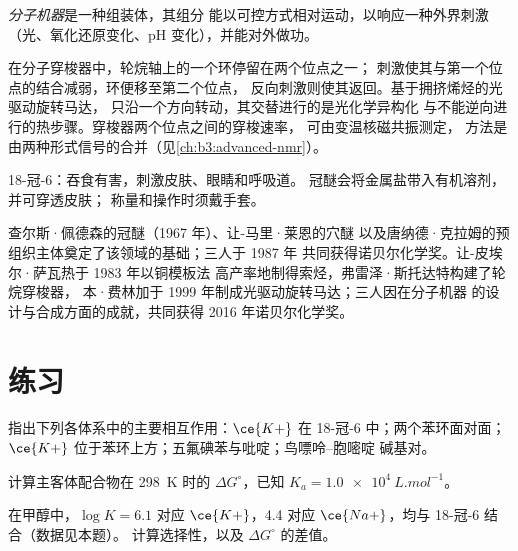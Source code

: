 \begin{definition}[分子机器]\label{def:b3:supramolecular:machine}
\emph{分子机器}是一种组装体，其组分
能以可控方式相对运动，以响应一种外界刺激
（光、氧化还原变化、pH 变化），并能对外做功。
\end{definition}

在分子穿梭器中，轮烷轴上的一个环停留在两个位点之一；
刺激使其与第一个位点的结合减弱，环便移至第二个位点，
反向刺激则使其返回。基于拥挤烯烃的光驱动旋转马达，
只沿一个方向转动，其交替进行的是光化学异构化
与不能逆向进行的热步骤。穿梭器两个位点之间的穿梭速率，
可由变温核磁共振测定，
方法是由两种形式信号的合并（见\cref{ch:b3:advanced-nmr}）。

\begin{safety}{}
18-冠-6：吞食有害，刺激皮肤、眼睛和呼吸道。
冠醚会将金属盐带入有机溶剂，并可穿透皮肤；
称量和操作时须戴手套。
\end{safety}

\begin{history}[超分子化学及其机器]
查尔斯·佩德森的冠醚（1967 年）、让-马里·莱恩的穴醚
以及唐纳德·克拉姆的预组织主体奠定了该领域的基础；三人于 1987 年
共同获得诺贝尔化学奖。让-皮埃尔·萨瓦热于 1983 年以铜模板法
高产率地制得索烃，弗雷泽·斯托达特构建了轮烷穿梭器，
本·费林加于 1999 年制成光驱动旋转马达；三人因在分子机器
的设计与合成方面的成就，共同获得 2016 年诺贝尔化学奖。
\end{history}

\section{练习}

\begin{exercise}[$\star$]\label{exo:b3:supramolecular:1}
指出下列各体系中的主要相互作用：$\ce{K+}$ 在 18-冠-6 中；两个苯环面对面；
$\ce{K+}$ 位于苯环上方；五氟碘苯与吡啶；鸟嘌呤–胞嘧啶
碱基对。
\end{exercise}

\begin{exercise}[$\star$]\label{exo:b3:supramolecular:2}
计算主客体配合物在 \qty{298}{K} 时的 $\Delta G^\circ$，已知 $K_a = \qty{1.0e4}{L.mol^{-1}}$。
\end{exercise}

\begin{exercise}[$\star$]\label{exo:b3:supramolecular:3}
在甲醇中，$\log K = 6.1$ 对应 $\ce{K+}$，4.4 对应 $\ce{Na+}$，均与 18-冠-6 结合（数据见本题）。
计算选择性，以及 $\Delta G^\circ$ 的差值。
\end{exercise}


